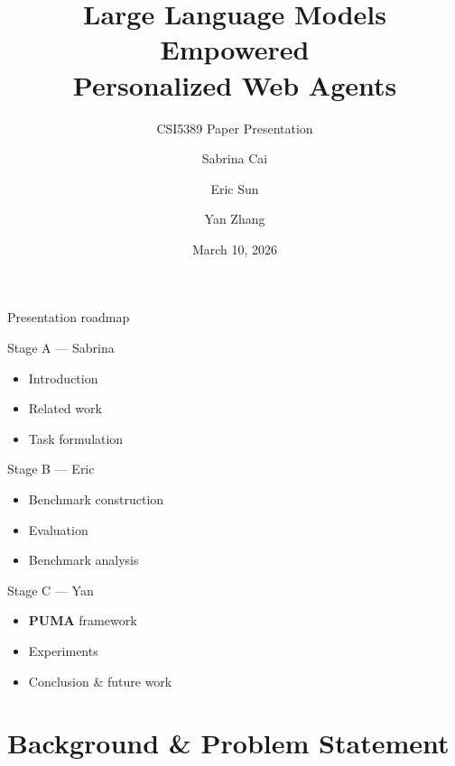 \documentclass[10pt]{beamer}
\title[Personalized Web Agents]{Large Language Models Empowered\\Personalized Web Agents}
\subtitle{CSI5389 Paper Presentation}
\author[S. Cai, E. Sun, Y. Zhang]{Sabrina Cai \and Eric Sun \and Yan Zhang}
\institute[EECS, University of Ottawa]{EECS, University of Ottawa\\
\texttt{\{hcai062, ysun338, Yan.Zhang\}@uOttawa.ca}}
\date[March 10, 2026]{March 10, 2026}
\begin{document}
\begin{frame}
  \titlepage
\end{frame}

\begin{frame}{Presentation roadmap}
  \begin{block}{Stage A --- Sabrina}
    \small
    \begin{itemize}
      \item Introduction
      \item Related work
      \item Task formulation
    \end{itemize}
  \end{block}
  \begin{block}{Stage B --- Eric}
    \small
    \begin{itemize}
      \item Benchmark construction
      \item Evaluation
      \item Benchmark analysis
    \end{itemize}
  \end{block}
  \begin{block}{Stage C --- Yan}
    \small
    \begin{itemize}
      \item \textbf{PUMA} framework
      \item Experiments
      \item Conclusion \& future work
    \end{itemize}
  \end{block}
\end{frame}

\section{Background \& Problem Statement}
\end{document}
